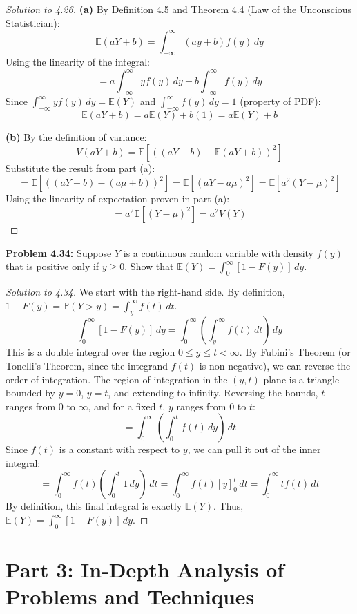 \documentclass[11pt, a4paper]{article}
\theoremstyle{definition}
\theoremstyle{remark}
\newcommand{\E}{\mathbb{E}}
\newcommand{\Prob}{\mathbb{P}}
\begin{document}
\begin{proof}[Solution to 4.26]
\textbf{(a)} By Definition 4.5 and Theorem 4.4 (Law of the Unconscious Statistician):
\[ \E(aY + b) = \int_{-\infty}^{\infty} (ay + b) f(y) \, dy \]
Using the linearity of the integral:
\[ = a \int_{-\infty}^{\infty} y f(y) \, dy + b \int_{-\infty}^{\infty} f(y) \, dy \]
Since $\int_{-\infty}^{\infty} y f(y) \, dy = \E(Y)$ and $\int_{-\infty}^{\infty} f(y) \, dy = 1$ (property of PDF):
\[ \E(aY + b) = a\E(Y) + b(1) = a\E(Y) + b \]

\textbf{(b)} By the definition of variance:
\[ V(aY + b) = \E\left[ ((aY + b) - \E(aY + b))^2 \right] \]
Substitute the result from part (a):
\[ = \E\left[ ((aY + b) - (a\mu + b))^2 \right] = \E\left[ (aY - a\mu)^2 \right] = \E\left[ a^2(Y - \mu)^2 \right] \]
Using the linearity of expectation proven in part (a):
\[ = a^2 \E\left[ (Y - \mu)^2 \right] = a^2 V(Y) \]
\end{proof}

\textbf{Problem 4.34:} Suppose $Y$ is a continuous random variable with density $f(y)$ that is positive only if $y \ge 0$. Show that $\E(Y) = \int_{0}^{\infty} [1 - F(y)] \, dy$.

\begin{proof}[Solution to 4.34]
We start with the right-hand side. By definition, $1 - F(y) = \Prob(Y > y) = \int_{y}^{\infty} f(t) \, dt$.
\[ \int_{0}^{\infty} [1 - F(y)] \, dy = \int_{0}^{\infty} \left( \int_{y}^{\infty} f(t) \, dt \right) \, dy \]
This is a double integral over the region $0 \le y \le t < \infty$. By Fubini's Theorem (or Tonelli's Theorem, since the integrand $f(t)$ is non-negative), we can reverse the order of integration. The region of integration in the $(y, t)$ plane is a triangle bounded by $y=0$, $y=t$, and extending to infinity.
Reversing the bounds, $t$ ranges from $0$ to $\infty$, and for a fixed $t$, $y$ ranges from $0$ to $t$:
\[ = \int_{0}^{\infty} \left( \int_{0}^{t} f(t) \, dy \right) \, dt \]
Since $f(t)$ is a constant with respect to $y$, we can pull it out of the inner integral:
\[ = \int_{0}^{\infty} f(t) \left( \int_{0}^{t} 1 \, dy \right) \, dt = \int_{0}^{\infty} f(t) [y]_{0}^{t} \, dt = \int_{0}^{\infty} t f(t) \, dt \]
By definition, this final integral is exactly $\E(Y)$. Thus, $\E(Y) = \int_{0}^{\infty} [1 - F(y)] \, dy$.
\end{proof}

\newpage
\section{Part 3: In-Depth Analysis of Problems and Techniques}
\end{document}
